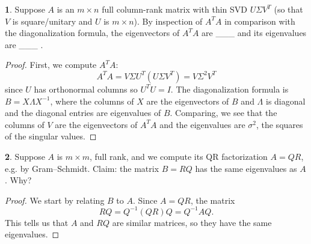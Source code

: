 \documentclass{article}
\theoremstyle{definition}
\newtheorem{prob}{}
\begin{document}
\begin{prob}

Suppose $A$ is an $m \times n$ full column-rank matrix with thin SVD $U\Sigma V^T$ (so that $V$ is square/unitary and $U$ is $m \times n$).   By inspection of $A^T A$ in comparison with the diagonalization formula, the eigenvectors of $A^T A$ are \_\_\_ and its eigenvalues are \_\_\_ .
\end{prob}

\begin{proof}
	First, we compute $A^TA:$
	\[A^TA= V \Sigma U^T (U \Sigma V^T)= V \Sigma^2 V^T\]
	since $U$ has orthonormal columns so $U^TU=I$. The diagonalization formula is $B= X \Lambda X^{-1}$, where the columns of $X$ are the eigenvectors of $B$ and $\Lambda$ is diagonal and the diagonal entries are eigenvalues of $B$. Comparing, we see that the columns of $V$ are the eigenvectors of $A^TA$ and the eigenvalues are $\sigma^2$, the squares of the singular values.
\end{proof}

\begin{prob}
	Suppose $A$ is $m \times m$, full rank, and we compute its QR factorization $A=QR$, e.g. by Gram–Schmidt.   Claim: the matrix $B=RQ$ has the same eigenvalues as $A$.  Why?
\end{prob}
\begin{proof}
	We start by relating $B$ to $A$. Since $A=QR$, the matrix $$RQ=Q^{-1} (QR) Q= Q^{-1} A Q.$$ This tells us that $A$ and $RQ$ are similar matrices, so they have the same eigenvalues.
\end{proof}
\end{document}

